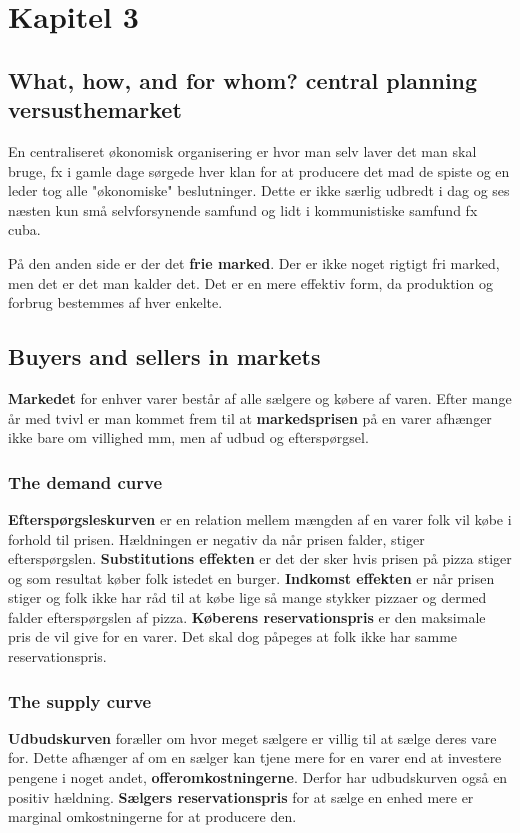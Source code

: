 \section{Kapitel 3}
\subsection{What, how, and for whom? central planning versusthemarket}
En centraliseret økonomisk organisering er hvor man selv laver det man skal bruge, fx i gamle dage sørgede hver klan for at producere det mad de spiste og en leder tog alle "økonomiske" beslutninger. Dette er ikke særlig udbredt i dag og ses næsten kun små selvforsynende samfund og lidt i kommunistiske samfund fx cuba. 

På den anden side er der det \textbf{frie marked}. Der  er ikke noget rigtigt fri marked, men det er det man kalder det. Det er en mere effektiv form, da produktion og forbrug bestemmes af hver enkelte. 

\subsection{Buyers and sellers in markets}
\textbf{Markedet} for enhver varer består af alle sælgere og købere af varen. Efter mange år med tvivl er man kommet frem til at \textbf{markedsprisen} på en varer afhænger ikke bare om villighed mm, men af udbud og efterspørgsel. 

\subsubsection{The demand curve} 
\textbf{Efterspørgsleskurven} er en relation mellem mængden af en varer folk vil købe i forhold til prisen. Hældningen er negativ da når prisen falder, stiger efterspørgslen. \textbf{Substitutions effekten} er det der sker hvis prisen på pizza stiger og som resultat køber folk istedet en burger. \textbf{Indkomst effekten} er når prisen stiger og folk ikke har råd til at købe lige så mange stykker pizzaer og dermed falder efterspørgslen af pizza. \textbf{Køberens reservationspris} er den maksimale pris de vil give for en varer. Det skal dog påpeges at folk ikke har samme reservationspris. 

\subsubsection{The supply curve}
\textbf{Udbudskurven}  foræller om hvor meget sælgere er villig til at sælge deres vare for. Dette afhænger af om en sælger kan tjene mere for en varer end at investere pengene i noget andet, \textbf{offeromkostningerne}. Derfor har udbudskurven også en positiv hældning. \textbf{Sælgers reservationspris} for at sælge en enhed mere er marginal omkostningerne for at producere den. 

